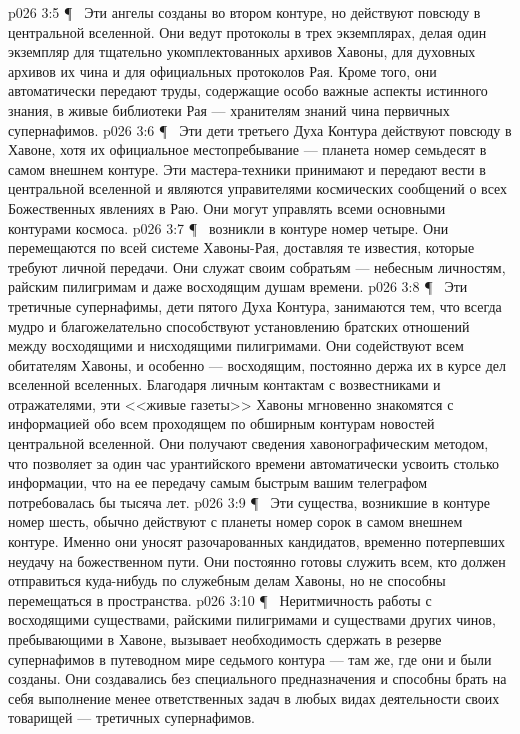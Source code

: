 \vs p026 3:5 \P\ \bibnobreakspace {} Эти ангелы созданы во втором контуре, но действуют повсюду в центральной вселенной. Они ведут протоколы в трех экземплярах, делая один экземпляр для тщательно укомплектованных архивов Хавоны, для духовных архивов их чина и для официальных протоколов Рая. Кроме того, они автоматически передают труды, содержащие особо важные аспекты истинного знания, в живые библиотеки Рая --- хранителям знаний чина первичных супернафимов.
\vs p026 3:6 \P\ \bibnobreakspace {} Эти дети третьего Духа Контура действуют повсюду в Хавоне, хотя их официальное местопребывание --- планета номер семьдесят в самом внешнем контуре. Эти мастера\hyp{}техники принимают и передают вести в центральной вселенной и являются управителями космических сообщений о всех Божественных явлениях в Раю. Они могут управлять всеми основными контурами космоса.
\vs p026 3:7 \P\ \bibnobreakspace {} возникли в контуре номер четыре. Они перемещаются по всей системе Хавоны\hyp{}Рая, доставляя те известия, которые требуют личной передачи. Они служат своим собратьям --- небесным личностям, райским пилигримам и даже восходящим душам времени.
\vs p026 3:8 \P\ \bibnobreakspace {} Эти третичные супернафимы, дети пятого Духа Контура, занимаются тем, что всегда мудро и благожелательно способствуют установлению братских отношений между восходящими и нисходящими пилигримами. Они содействуют всем обитателям Хавоны, и особенно --- восходящим, постоянно держа их в курсе дел вселенной вселенных. Благодаря личным контактам с возвестниками и отражателями, эти <<живые газеты>> Хавоны мгновенно знакомятся с информацией обо всем проходящем по обширным контурам новостей центральной вселенной. Они получают сведения хавонографическим методом, что позволяет за один час урантийского времени автоматически усвоить столько информации, что на ее передачу самым быстрым вашим телеграфом потребовалась бы тысяча лет.
\vs p026 3:9 \P\ \bibnobreakspace {} Эти существа, возникшие в контуре номер шесть, обычно действуют с планеты номер сорок в самом внешнем контуре. Именно они уносят разочарованных кандидатов, временно потерпевших неудачу на божественном пути. Они постоянно готовы служить всем, кто должен отправиться куда\hyp{}нибудь по служебным делам Хавоны, но не способны перемещаться в пространства.
\vs p026 3:10 \P\ \bibnobreakspace {} Неритмичность работы с восходящими существами, райскими пилигримами и существами других чинов, пребывающими в Хавоне, вызывает необходимость сдержать в резерве супернафимов в путеводном мире седьмого контура --- там же, где они и были созданы. Они создавались без специального предназначения и способны брать на себя выполнение менее ответственных задач в любых видах деятельности своих товарищей --- третичных супернафимов.
